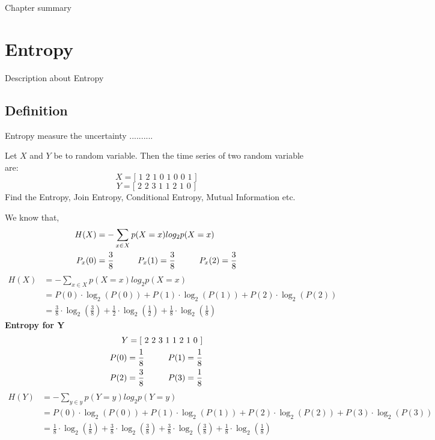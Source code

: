 Chapter summary
\section{Entropy}
Description about Entropy 
\subsection{Definition}
\hspace{4em}
Entropy measure the uncertainty ..........
\hspace{4em}
\begin{problem}{01}
Let $X$ and $Y$ be to random variable. Then the time series of two random variable are:  
$$ X = \text{[ 1 2 1 0 1 0 0 1 ]} $$
$$ Y = \text{[ 2 2 3 1 1 2 1 0 ]}$$
Find the Entropy, Join Entropy, Conditional Entropy, Mutual Information etc. 
\end{problem}
\begin{solution}
We know that, 
\begin{align*}
    H(X) &= - \sum_{x\in X } p(X=x) log_{2} p(X=x) \\
    P_x(0) &= \frac{3}{8}  \hspace{10mm}   P_x(1) = \frac{3}{8}  \hspace{10mm}    P_x(2) = \frac{3}{8}  \\  
\end{align*}
\begin{align*}
    H(X) &= - \sum_{x\in X } p(X=x) log_{2} p(X=x) \\
    &= P(0)\cdot \log_{2}(P(0)) + P(1)\cdot \log_{2}(P(1)) + P(2)\cdot \log_{2}(P(2))\\
    &= \frac{3}{8} \cdot \log_{2}(\frac{3}{8}) + \frac{1}{2} \cdot \log_{2}(\frac{1}{2}) + \frac{1}{8} \cdot \log_{2}(\frac{1}{8})
\end{align*}
\textbf{Entropy for Y}
\begin{align*}
    Y = [\text{ 2 2 3 1 1 2 1 0 }]\\
    P(0) = \frac{1}{8} \hspace{10mm} P(1) = \frac{1}{8} \\
    P(2) = \frac{3}{8} \hspace{10mm} P(3) = \frac{1}{8}
\end{align*}
\begin{align*}
    H(Y) &= - \sum_{y\in y } p(Y=y) log_{2} p(Y=y) \\
    &= P(0)\cdot \log_{2}(P(0)) + P(1)\cdot \log_{2}(P(1)) + P(2)\cdot \log_{2}(P(2))+P(3)\cdot \log_{2}(P(3))\\
    &= \frac{1}{8} \cdot \log_{2}(\frac{1}{8}) + \frac{3}{8} \cdot \log_{2}(\frac{3}{8}) + \frac{3}{8} \cdot \log_{2}(\frac{3}{8}) + \frac{1}{8} \cdot \log_{2}(\frac{1}{8})
\end{align*}

\end{solution}
